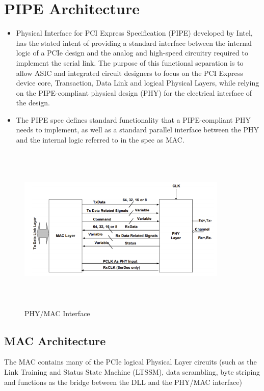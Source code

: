 \section{PIPE Architecture}
\begin{itemize}
    \item Physical Interface for PCI Express Specification (PIPE) developed by Intel, has the
stated intent of providing a standard interface between the internal logic of a
PCIe design and the analog and high-speed circuitry required to implement the
serial link. The purpose of this functional separation is to allow ASIC and
integrated circuit designers to focus on the PCI Express device core, Transaction,
Data Link and logical Physical Layers, while relying on the PIPE-compliant physical
design (PHY) for the electrical interface of the design. 
    \item The PIPE spec defines standard functionality that a PIPE-compliant PHY needs to
implement, as well as a standard parallel interface between the PHY and the
internal logic referred to in the spec as MAC. 

    
\end{itemize}
\begin{figure}[H]
  \centering
  \includegraphics[width=100mm,height=80mm]{images/phymac.png}
  \caption{PHY/MAC Interface}
  \label{lane}
\end{figure}
\subsection{MAC Architecture}

The MAC contains many of the PCIe logical Physical Layer circuits (such as the Link
Training and Status State Machine (LTSSM), data scrambling, byte striping and
functions as the bridge between the DLL and the PHY/MAC interface)
